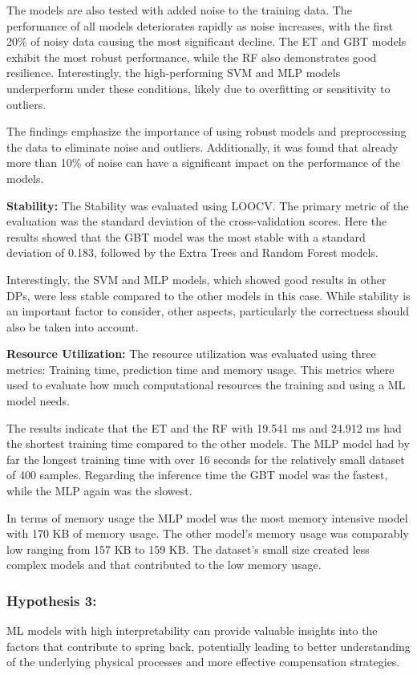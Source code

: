 The models are also tested with added noise to the training data.
The performance of all models deteriorates rapidly as noise increases, with the first 20\% of noisy data causing the
most significant decline.
The \ac{ET} and \ac{GBT} models exhibit the most robust performance, while the \ac{RF} also demonstrates good
resilience.
Interestingly, the high-performing SVM and MLP models underperform under these conditions, likely due to overfitting
or sensitivity to outliers.

The findings emphasize the importance of using robust models and preprocessing the data to eliminate noise and
outliers.
Additionally, it was found that already more than 10\% of noise can have a significant impact on the
performance of the models.


\textbf{Stability:} The Stability was evaluated using \ac{LOOCV}.
The primary metric of the evaluation was the standard deviation of the cross-validation scores.
Here the results showed that the \ac{GBT} model was the most stable with a standard deviation of 0.183,
followed by the Extra Trees and Random Forest models.

Interestingly, the SVM and MLP models, which showed good results in other \ac{DP}s, were less stable
compared to the other models in this case.
While stability is an important factor to consider, other aspects, particularly the correctness
should also be taken into account.

\textbf{Resource Utilization:} The resource utilization was evaluated using three metrics: Training time,
prediction time and memory usage.
This metrics where used to evaluate how much computational resources the training and using a \ac{ML} model needs.

The results indicate that the \ac{ET} and the \ac{RF} with 19.541 ms and 24.912 ms had the
shortest training time compared to the other models.
The \ac{MLP} model had by far the longest training time with over 16 seconds for the relatively small dataset of 400
samples.
Regarding the inference time the \ac{GBT} model was the fastest, while the MLP again was the slowest.

In terms of memory usage the \ac{MLP} model was the most memory intensive model with 170 KB of memory usage.
The other model's memory usage was comparably low ranging from 157 KB to 159 KB.
The dataset's small size created less complex models and that contributed to the low memory usage.


\subsubsection{Hypothesis 3:} ML models with high interpretability can provide valuable insights into the factors that
contribute to spring back, potentially leading to better understanding of the underlying physical processes and
more effective compensation strategies.

